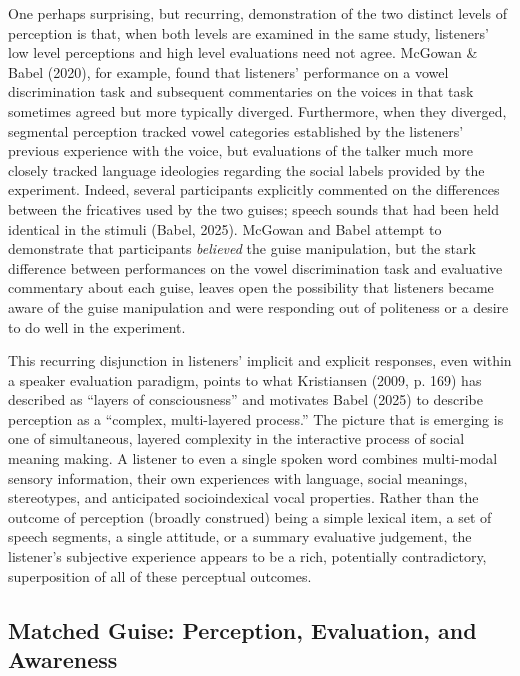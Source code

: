 \documentclass[
  letterpaper,
  DIV=11,
  numbers=noendperiod]{scrartcl}
\begin{document}
One perhaps surprising, but recurring, demonstration of the two distinct
levels of perception is that, when both levels are examined in the same
study, listeners' low level perceptions and high level evaluations need
not agree. McGowan \& Babel (2020), for example, found that listeners'
performance on a vowel discrimination task and subsequent commentaries
on the voices in that task sometimes agreed but more typically diverged.
Furthermore, when they diverged, segmental perception tracked vowel
categories established by the listeners' previous experience with the
voice, but evaluations of the talker much more closely tracked language
ideologies regarding the social labels provided by the experiment.
Indeed, several participants explicitly commented on the differences
between the fricatives used by the two guises; speech sounds that had
been held identical in the stimuli (Babel, 2025). McGowan and Babel
attempt to demonstrate that participants \emph{believed} the guise
manipulation, but the stark difference between performances on the vowel
discrimination task and evaluative commentary about each guise, leaves
open the possibility that listeners became aware of the guise
manipulation and were responding out of politeness or a desire to do
well in the experiment.

This recurring disjunction in listeners' implicit and explicit
responses, even within a speaker evaluation paradigm, points to what
Kristiansen (2009, p. 169) has described as ``layers of consciousness''
and motivates Babel (2025) to describe perception as a ``complex,
multi-layered process.'' The picture that is emerging is one of
simultaneous, layered complexity in the interactive process of social
meaning making. A listener to even a single spoken word combines
multi-modal sensory information, their own experiences with language,
social meanings, stereotypes, and anticipated socioindexical vocal
properties. Rather than the outcome of perception (broadly construed)
being a simple lexical item, a set of speech segments, a single
attitude, or a summary evaluative judgement, the listener's subjective
experience appears to be a rich, potentially contradictory,
superposition of all of these perceptual outcomes.

\subsection{Matched Guise: Perception, Evaluation, and
Awareness}\label{sec-mgt}
\end{document}
